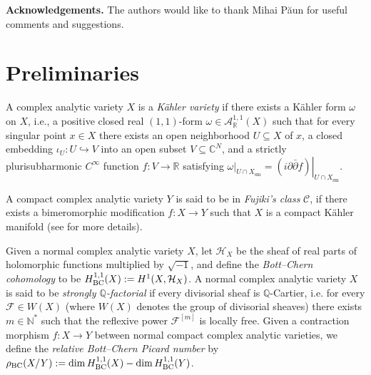 \documentclass[11pt]{amsart}
\numberwithin{equation}{section}
\def\dim{\operatorname{dim}}
\theoremstyle{definition}
\theoremstyle{definition}
\theoremstyle{definition}
\begin{document}
\medskip

\noindent

\textbf{Acknowledgements.} The authors would like to thank Mihai P\u{a}un for useful comments and suggestions.
\section{Preliminaries}


A complex analytic variety $X$ is a \emph{K\"ahler variety} if there exists a K\"ahler
form $\omega$ on $X$, i.e., a positive closed real $(1,1)$-form
$\omega \in \mathcal{A}_{\mathbb{R}}^{1,1}(X)$ such that for every singular point
$x \in X$ there exists an open neighborhood $U \subseteq X$ of $x$, a closed embedding
$\iota_U : U \hookrightarrow V$ into an open subset $V \subseteq \mathbb{C}^N$,
and a strictly plurisubharmonic $C^{\infty}$ function $f : V \to \mathbb{R}$
satisfying $\left.\omega\right|_{U \cap X_{\mathrm{sm}}}
= \left.(i \partial \bar{\partial} f)\right|_{U \cap X_{\mathrm{sm}}}$.


A compact complex analytic variety $Y$ is said to be in \emph{Fujiki's class} $\mathcal C$, if there exists
a bimeromorphic modification $f : X \to Y$ such that $X$ is a compact K\"ahler
manifold (see \cite[Definition 2.2]{DH25} for more details). 

Given a normal complex analytic variety $X$, let $\mathcal{H}_X$ be the sheaf of real parts of holomorphic functions multiplied by $\sqrt{-1}$, and define the \textit{Bott--Chern cohomology} to be $H^{1,1}_{\rm{BC}}(X): =  H^1(X, \mathcal{H}_X)$. A normal complex analytic variety $X$ is said to be \textit{strongly $\mathbb{Q}$-factorial} if every divisorial sheaf is $\mathbb{Q}$-Cartier, i.e. for every $\mathcal{F} \in W(X)$ (where $W(X)$ denotes the group of divisorial sheaves) there exists $m \in \mathbb{N}^*$ such that the reflexive power $\mathcal{F}^{[m]}$ is locally free. 
 Given a contraction morphism $f: X\to Y$ between normal compact complex analytic varieties, we define the \textit{relative Bott--Chern Picard number} by $\rho_{\rm BC}(X/Y):=\dim H^{1,1}_{\rm BC}(X)- \dim H^{1,1}_{\rm BC}(Y)$.
\end{document}
